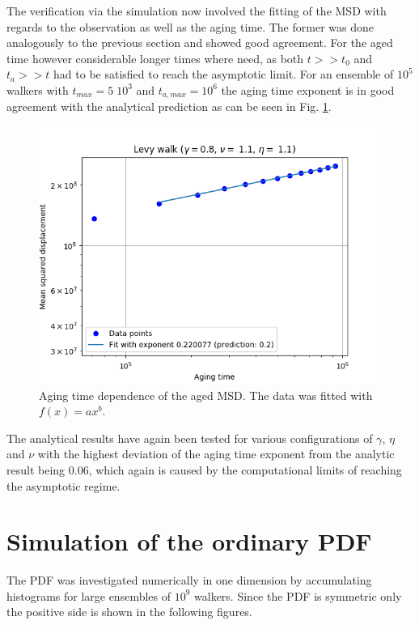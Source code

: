 The verification via the simulation now involved the fitting of the MSD with regards to the observation as well as the aging time. The former was done analogously to the previous section and showed good agreement. For the aged time however considerable longer times where need, as both $t>> t_0$ and $t_a>> t$ had to be satisfied to reach the asymptotic limit. For an ensemble of $10^5$ walkers with $t_{max}=5\; 10^{3}$ and $t_{a,max} = 10^{6}$ the aging time exponent is in good agreement with  the analytical prediction as can be seen in Fig. \ref{fig:plotMSDaged}.
%
\begin{figure}
\begin{center}
\includegraphics[width=120mm]{pics/plotMSDaged}
\caption{Aging time dependence of the aged MSD. The data was fitted with $f(x) = ax^b$.
\label{fig:plotMSDaged} }
\end{center}
\end{figure} 
%
The analytical results have again been tested for various configurations of $\gamma$, $\eta$ and $\nu$ with the highest deviation of the aging time exponent from the analytic result being 0.06, which again is caused by the computational limits of reaching the asymptotic regime.


\section{Simulation of the ordinary PDF} \label{sec:simulatedPDF}

The \gls{PDF} was investigated numerically in one dimension by accumulating histograms for large ensembles of $10^{9}$ walkers. Since the \gls{PDF} is symmetric only the positive side is shown in the following figures.\\

